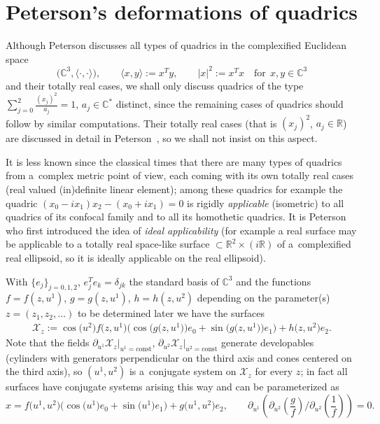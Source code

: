 \section{Peterson's deformations of quadrics}\label{sec:pet}

Although Peterson \cite{P} discusses all types of quadrics in the
complexif\/ied Euclidean space
\[
\big(\mathbb{C}^3,\langle \cdot,\cdot\rangle\big),\qquad \langle x,y\rangle:=x^Ty,\qquad |x|^2:=x^Tx\quad \mathrm{for}\ \
x,y\in\mathbb{C}^3
\]
and their totally real cases, we shall only discuss quadrics of
the type $\sum\limits_{j=0}^2\frac{(x_j)^2}{a_j}=1$, $a_j\in\mathbb{C}^*$
distinct, since the remaining cases of quadrics should follow by
similar computations. Their totally real cases (that is
$(x_j)^2$, $a_j\in\mathbb{R}$) are discussed in detail in Peterson~\cite{P}, so we shall not insist on this aspect.

\begin{remark}
It is less known since the classical times that there are many
types of quadrics from a~complex metric point of view, each coming
with its own totally real cases (real valued (in)def\/inite linear
element); among these quadrics for example the quadric
$(x_0-ix_1)x_2-(x_0+ix_1)=0$ is rigidly {\it applicable}
(isometric) to all quadrics of its confocal family and to all its
homothetic quadrics. It is Peterson who f\/irst introduced the idea
of {\it ideal applicability} (for example a real surface may be
applicable to a totally real space-like surface
$\subset\mathbb{R}^2\times(i\mathbb{R})$ of a~complexif\/ied real
ellipsoid, so it is ideally applicable on the real ellipsoid).
\end{remark}

With $\{e_j\}_{j=0,1,2}$, $e_j^Te_k=\delta_{jk}$ the standard basis
of $\mathbb{C}^3$  and the functions $f=f(z,u^1)$, $g=g(z,u^1)$,
$h=h(z,u^2)$ depending on the parameter(s) $z=(z_1,z_2,\dots )$ to be
determined later we have the surfaces
\begin{gather}
\mathcal{X}_z:=\cos\big(u^2\big)f\big(z,u^1\big)\big(\cos\big(g\big(z,u^1\big)\big)e_0+\sin
\big(g\big(z,u^1\big)\big)e_1\big)+h\big(z,u^2\big)e_2.
\label{eq:surf}
\end{gather}
Note that the f\/ields
$\partial_{u^1}\mathcal{X}_z|_{u^1=\mathrm{const}}$,
$\partial_{u^2}\mathcal{X}_z|_{u^2=\mathrm{const}}$ generate developables
(cylinders with gene\-ra\-tors perpendicular on the third axis and
cones centered on the third axis), so $(u^1,u^2)$ is a~conjugate
system on $\mathcal{X}_z$ for every $z$; in fact all surfaces have
conjugate systems arising this way and can be parameterized as
\[
x=f\big(u^1,u^2\big)\big(\cos\big(u^1\big)e_0+\sin\big(u^1\big)e_1\big)+g\big(u^1,u^2\big)e_2, \qquad
\partial_{u^1}\left(\partial_{u^2}\left(\frac{g}{f}\right){\Big/}\partial_{u^2}\left(\frac{1}{f}\right)\right)=0.
\]

